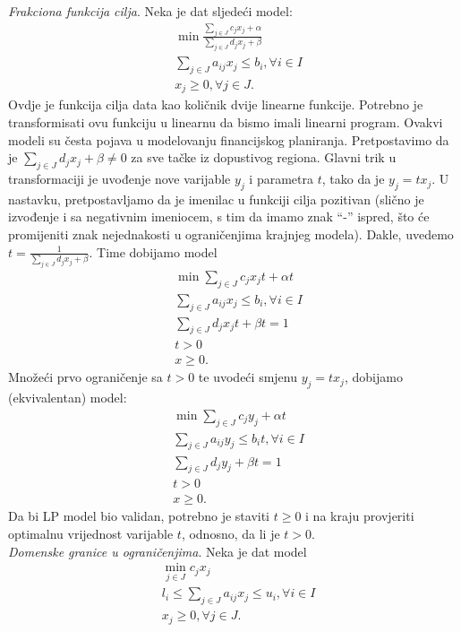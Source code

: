 \documentclass[a4paper, utf8, 11pt, colorlinks]{book}
\begin{document}
\emph{Frakciona funkcija cilja}. Neka je dat sljedeći model:
\begin{align*}
	& \min \frac{\sum_{j \in J} c_j x_j + \alpha}{ \sum_{j \in J} d_j x_j + \beta} \\
	& \sum_{j \in J} a_{ij} x_j \leq b_i,  \forall i \in I \\
	& x_j \geq 0, \forall j \in J.
\end{align*}
Ovdje je funkcija cilja data kao količnik dvije linearne funkcije. Potrebno je transformisati ovu funkciju u linearnu da bismo imali linearni program. Ovakvi modeli su česta pojava u modelovanju financijskog planiranja. Pretpostavimo da je $\sum_{j \in J}d_j x_j + \beta \neq 0$ za sve tačke iz dopustivog regiona. Glavni trik u transformaciji je uvođenje nove varijable $y_j$ i parametra $t$, tako da je $y_j = t x_j$. U nastavku, pretpostavljamo da je imenilac u funkciji cilja pozitivan (slično je izvođenje i sa negativnim imeniocem, s tim da imamo znak ``-'' ispred, što će promijeniti znak nejednakosti u ograničenjima krajnjeg modela). Dakle, uvedemo $t = \frac{1}{\sum_{j \in J} d_j x_j + \beta }$. Time dobijamo model
\begin{align*}
	&\min \sum_{j \in J} c_j x_j t + \alpha t \\
	&\sum_{j \in J} a_{ij} x_j \leq b_i,  \forall i \in I \\
	& \sum_{j \in J} d_j x_j t + \beta t = 1 \\
	& t > 0 \\
	& x \geq 0.
\end{align*}
Množeći prvo ograničenje sa $t>0$ te uvodeći smjenu $y_j = t x_j$, dobijamo (ekvivalentan)  model:
\begin{align*}
	&\min \sum_{j \in J} c_j y_j + \alpha t \\
	& \sum_{j \in J} a_{ij} y_j \leq b_i t,  \forall i \in I \\
	& \sum_{j \in J} d_j y_j + \beta t = 1 \\
	& t > 0 \\
	& x \geq 0.
\end{align*}
Da bi LP model bio validan, potrebno je staviti $t \geq 0$ i na kraju provjeriti optimalnu vrijednost varijable $t$, odnosno, da li je $t>0$.   \\
\emph{Domenske granice u ograničenjima}. Neka je dat model
\begin{align*}
	&\min_{j \in J } c_j x_j \\
	& l_i \leq \sum_{j \in J} a_{ij} x_j \leq u_i, \forall i\in I \\
	& x_j \geq 0, \forall j \in J.
\end{align*} 
\end{document}
